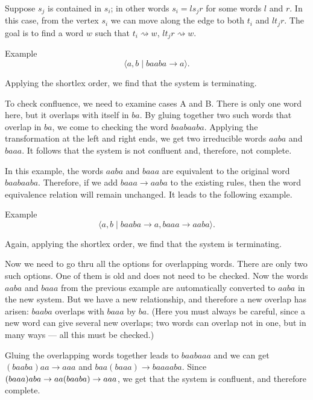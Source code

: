  Suppose  $s_{j}$ is contained in $s_{i}$;
in other words $s_i=ls_{j}r$ for some words $l$ and $r$.
In this case, from the vertex $s_{i}$ we can move along the edge to both $t_{i}$ and $lt_{j}r$.
The goal is to find a word $w$ such that $t_{i}\rightsquigarrow w$, $lt_{j}r\rightsquigarrow w$.


\begin{thm}{Example}\label{em:baaba>a}
\[\langle a,b \mid baaba\to a\rangle.\]
\end{thm}

Applying the shortlex order, we find that the system is terminating.

To check confluence, we need to examine cases A and B.
There is only one word here, but it overlaps with itself in $ba$.
By gluing together two such words that overlap in $ba$, we come to checking the word $baabaaba$.
Applying the transformation at the left and right ends, we get two irreducible words
$aaba$ and $baaa$.
It follows that the system is not confluent and, therefore, not complete.

\medskip

In this example, the words $aaba$ and $baaa$ are equivalent to the original word $baabaaba$.
Therefore, if we add $baaa\to aaba$ to the existing rules, then the word equivalence relation will remain unchanged.
It leads to the following example.

\begin{thm}{Example}\label{em:baaba>a,baaa>aaba}
\[\langle a, b \mid baaba\to a, baaa\to aaba\rangle.\]
\end{thm}

Again, applying the shortlex order, we find that the system is terminating.

Now we need to go thru all the options for overlapping words.
There are only two such options.
One of them is old and does not need to be checked.
Now the words $aaba$ and $baaa$ from the previous example are automatically converted to $aaba$ in the new system.
But we have a new relationship, and therefore a new overlap has arisen: $baaba$ overlaps with $baaa$ by $ba$. (Here you must always be careful, since a new word can give several new overlaps;
two words can overlap not in one, but in many ways --- all this must be checked.)

Gluing the overlapping words together leads to $baabaaa$
and we can get $(baaba)aa\to aaa$
and $baa(baaa)\to baaaaba$.
Since $(baaa)aba \to  aa(baaba) \to aaa$, we get that the system is confluent,
and therefore complete.

